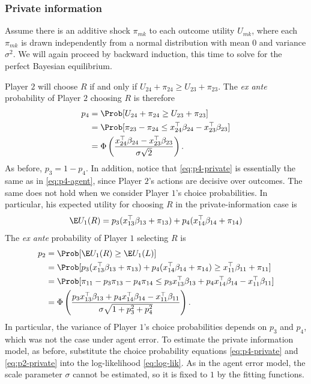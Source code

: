 \documentclass[article]{jss}
\begin{document}
\subsubsection{Private information}

Assume there is an additive shock $\pi_{mk}$ to each outcome utility $U_{mk}$,
where each $\pi_{mk}$ is drawn independently from a normal distribution with
mean $0$ and variance $\sigma^2$.  We will again proceed by backward induction,
this time to solve for the perfect Bayesian equilibrium.

Player $2$ will choose $R$ if and only if $U_{24} + \pi_{24} \geq U_{23} +
\pi_{23}$.  The \textit{ex ante} probability of Player $2$ choosing $R$ is therefore
\begin{equation}
  \label{eq:p4-private}
  \begin{aligned}
    p_4 &= \Prob[ U_{24} + \pi_{24} \geq U_{23} + \pi_{23} ] \\
    &= \Prob[ \pi_{23} - \pi_{24} \leq x_{24}^{\top} \beta_{24} -  x_{23}^{\top}
    \beta_{23} ] \\
    &= \Phi \left(\frac{x_{24}^{\top} \beta_{24} -  x_{23}^{\top}
        \beta_{23}}{\sigma \sqrt{2}}\right).
  \end{aligned}
\end{equation}
As before, $p_3 = 1 - p_4$.  In addition, notice that \eqref{eq:p4-private} is
essentially the same as in \eqref{eq:p4-agent}, since Player $2$'s actions are
decisive over outcomes.  The same does not hold when we consider Player $1$'s
choice probabilities.  In particular, his expected utility for choosing $R$ in
the private-information case is
\begin{displaymath}
  \E U_1(R) = p_3 (x_{13}^{\top} \beta_{13} + \pi_{13}) + p_4 (x_{14}^{\top}
  \beta_{14} + \pi_{14})
\end{displaymath}
The \textit{ex ante} probability of Player $1$ selecting $R$ is
\begin{equation}
  \label{eq:p2-private}
  \begin{aligned}
    p_2 &= \Prob[ \E U_1(R) \geq \E U_1(L) ] \\
    &= \Prob[ p_3 (x_{13}^{\top} \beta_{13} + \pi_{13}) + p_4 (x_{14}^{\top}
    \beta_{14} + \pi_{14}) \geq x_{11}^{\top} \beta_{11} + \pi_{11}] \\
    &= \Prob[ \pi_{11} - p_3 \pi_{13} - p_4 \pi_{14} \leq p_3 x_{13}^{\top}
    \beta_{13} + p_4 x_{14}^{\top} \beta_{14} - x_{11}^{\top} \beta_{11} ] \\
    &= \Phi \left( \frac{p_3 x_{13}^{\top} \beta_{13} + p_4 x_{14}^{\top}
        \beta_{14} - x_{11}^{\top} \beta_{11}}{\sigma \sqrt{1 + p_3^2 + p_4^2}}
    \right).
  \end{aligned}
\end{equation}
In particular, the variance of Player $1$'s choice probabilities depends on
$p_3$ and $p_4$, which was not the case under agent error.  To estimate the
private information model, as before, substitute the choice probability
equations \eqref{eq:p4-private} and \eqref{eq:p2-private} into the
log-likelihood \eqref{eq:log-lik}.  As in the agent error model, the scale
parameter $\sigma$ cannot be estimated, so it is fixed to $1$ by the fitting
functions.
\end{document}
